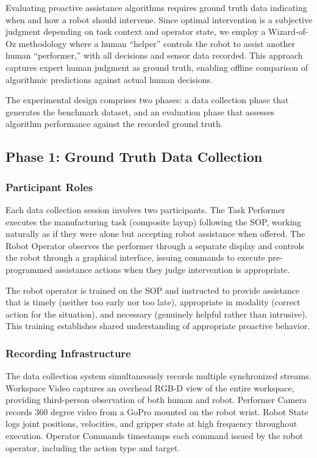\documentclass[sensors,article,submit,pdftex,moreauthors]{Definitions/mdpi}
\begin{document}
Evaluating proactive assistance algorithms requires ground truth data indicating when and how a robot should intervene. Since optimal intervention is a subjective judgment depending on task context and operator state, we employ a Wizard-of-Oz methodology where a human ``helper'' controls the robot to assist another human ``performer,'' with all decisions and sensor data recorded. This approach captures expert human judgment as ground truth, enabling offline comparison of algorithmic predictions against actual human decisions.

The experimental design comprises two phases: a data collection phase that generates the benchmark dataset, and an evaluation phase that assesses algorithm performance against the recorded ground truth.

\subsection{Phase 1: Ground Truth Data Collection}

\subsubsection{Participant Roles}

Each data collection session involves two participants. The Task Performer executes the manufacturing task (composite layup) following the SOP, working naturally as if they were alone but accepting robot assistance when offered. The Robot Operator observes the performer through a separate display and controls the robot through a graphical interface, issuing commands to execute pre-programmed assistance actions when they judge intervention is appropriate.

The robot operator is trained on the SOP and instructed to provide assistance that is timely (neither too early nor too late), appropriate in modality (correct action for the situation), and necessary (genuinely helpful rather than intrusive). This training establishes shared understanding of appropriate proactive behavior.

\subsubsection{Recording Infrastructure}

The data collection system simultaneously records multiple synchronized streams. Workspace Video captures an overhead RGB-D view of the entire workspace, providing third-person observation of both human and robot. Performer Camera records 360 degree video from a GoPro mounted on the robot wrist. Robot State logs joint positions, velocities, and gripper state at high frequency throughout execution. Operator Commands timestamps each command issued by the robot operator, including the action type and target.
\end{document}
